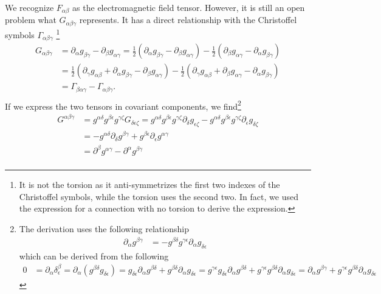 We recognize $F_{\alpha\beta}$ as the electromagnetic field tensor. However, it is still an open problem what $G_{\alpha\beta\gamma}$ represents. It has a direct relationship with the Christoffel symbols $\Gamma_{\alpha\beta\gamma}$ \footnote{It is not the torsion as it anti-symmetrizes the first two indexes of the Christoffel symbols, while the torsion uses the second two. In fact, we used the expression for a connection with no torsion to derive the expression.}
\begin{equation}
	\begin{aligned}
		G_{\alpha\beta\gamma} &= \partial_\alpha g_{\beta \gamma} - \partial_\beta g_{\alpha \gamma} = \frac{1}{2} (\partial_\alpha g_{\beta \gamma} - \partial_\beta g_{\alpha \gamma}) - \frac{1}{2} (\partial_\beta g_{\alpha \gamma} - \partial_\alpha g_{\beta \gamma}) \\
		&= \frac{1}{2} (\partial_\gamma g_{\alpha \beta} + \partial_\alpha g_{\beta \gamma} - \partial_\beta g_{\alpha \gamma}) - \frac{1}{2} (\partial_\gamma g_{\alpha \beta} + \partial_\beta g_{\alpha \gamma} - \partial_\alpha g_{\beta \gamma}) \\
		&= \Gamma_{\beta\alpha\gamma} - \Gamma_{\alpha\beta\gamma}. \\
	\end{aligned}
\end{equation}
If we express the two tensors in covariant components, we find\footnote{The derivation uses the following relationship
\begin{align*}
	\partial_{\alpha}g^{\beta\gamma} &= - g^{\beta\delta}g^{\gamma\epsilon} \partial_{\alpha}g_{\delta\epsilon}
\end{align*}
which can be derived from the following
\begin{align*}
	0 &= \partial_{\alpha}\delta^{\beta}_{\epsilon} = \partial_{\alpha} (g^{\beta\delta} g_{\delta\epsilon}) = g_{\delta\epsilon} \partial_{\alpha} g^{\beta\delta} + g^{\beta\delta} \partial_{\alpha} g_{\delta\epsilon}
	= g^{\gamma\epsilon} g_{\delta\epsilon} \partial_{\alpha} g^{\beta\delta} + g^{\gamma\epsilon} g^{\beta\delta} \partial_{\alpha} g_{\delta\epsilon}
	= \partial_{\alpha} g^{\beta\gamma} + g^{\gamma\epsilon} g^{\beta\delta} \partial_{\alpha} g_{\delta\epsilon}
\end{align*}
}
\begin{equation}
	\begin{aligned}
		G^{\alpha\beta\gamma} &= g^{\alpha\delta}g^{\beta\epsilon}g^{\gamma\zeta} G_{\delta\epsilon\zeta} = g^{\alpha\delta}g^{\beta\epsilon}g^{\gamma\zeta} \partial_\delta g_{\epsilon\zeta} - g^{\alpha\delta}g^{\beta\epsilon}g^{\gamma\zeta} \partial_\epsilon g_{\delta\zeta}\\
		&= - g^{\alpha\delta} \partial_\delta g^{\beta\gamma} + g^{\beta\epsilon} \partial_\epsilon g^{\alpha\gamma} \\
		&= \partial^\beta g^{\alpha\gamma} - \partial^\alpha g^{\beta\gamma} \\
	\end{aligned}
\end{equation}
